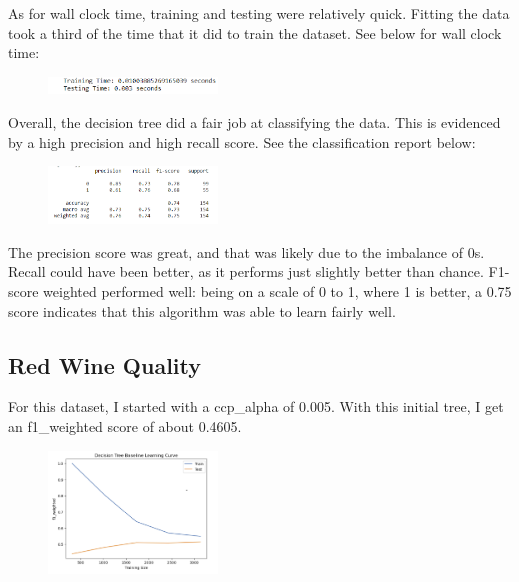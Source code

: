 \documentclass[conference]{IEEEtran}
\begin{document}
As for wall clock time, training and testing were relatively quick. Fitting the data took a third of the time that it did to train the dataset. See below for wall clock time:

\begin{figure}[H]
    \centering
    \includegraphics[width=0.40\textwidth]{PIMA Indian Diabetes Graphs/Decision Trees/dt wct.png}
    \label{fig:enter-label}
\end{figure}

Overall, the decision tree did a fair job at classifying the data. This is evidenced by a high precision and high recall score. See the classification report below: 

\begin{figure}[H]
    \centering
    \includegraphics[width=0.40\textwidth]{PIMA Indian Diabetes Graphs/Decision Trees/dtcr.png}
    \label{fig:enter-label}
\end{figure}
    
The precision score was great, and that was likely due to the imbalance of 0s. Recall could have been better, as it performs just slightly better than chance. F1-score weighted performed well: being on a scale of 0 to 1, where 1 is better, a 0.75 score indicates that this algorithm was able to learn fairly well. 

\subsection{\textbf{Red Wine Quality}}\label{BB}
For this dataset, I started with a ccp\_alpha of 0.005. With this initial tree, I get an f1\_weighted score of about 0.4605. 

\begin{figure}[H]
    \centering
    \includegraphics[width=0.40\textwidth]{Red Wine Quality Graph Images/Decision Trees/dt lc init.png}
    \label{fig:enter-label}
\end{figure}
\end{document}
